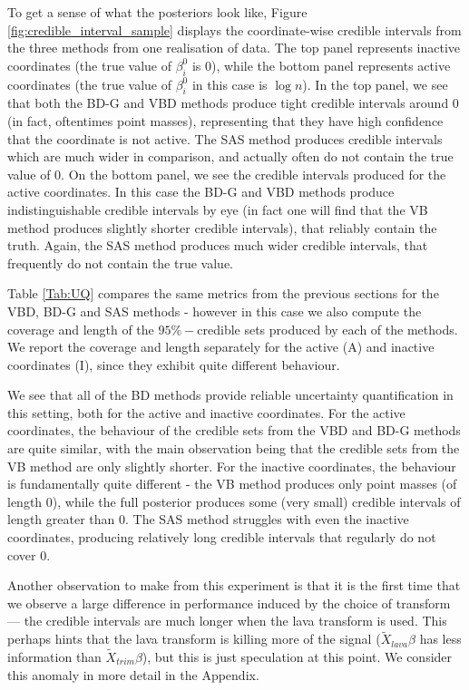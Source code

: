 \documentclass[11pt]{article}
\begin{document}
To get a sense of what the posteriors look like, Figure \ref{fig:credible_interval_sample} displays the coordinate-wise credible intervals from the three methods from one realisation of data. The top panel represents inactive coordinates (the true value of $\beta_i^0$ is 0), while the bottom panel represents active coordinates (the true value of $\beta_i^0$ in this case is $\log n$). In the top panel, we see that both the BD-G and VBD methods produce tight credible intervals around 0 (in fact, oftentimes point masses), representing that they have high confidence that the coordinate is not active. The SAS method produces credible intervals which are much wider in comparison, and actually often do not contain the true value of 0. On the bottom panel, we see the credible intervals produced for the active coordinates. In this case the BD-G and VBD methods produce indistinguishable credible intervals by eye (in fact one will find that the VB method produces slightly shorter credible intervals), that reliably contain the truth. Again, the SAS method produces much wider credible intervals, that frequently do not contain the true value.

Table \ref{Tab:UQ} compares the same metrics from the previous sections for the VBD, BD-G and SAS methods - however in this case we also compute the coverage and length of the $95\%-$credible sets produced by each of the methods. We report the coverage and length separately for the active (A) and inactive coordinates (I), since they exhibit quite different behaviour. 

We see that all of the BD methods provide reliable uncertainty quantification in this setting, both for the active and inactive coordinates. For the active coordinates, the behaviour of the credible sets from the VBD and BD-G methods are quite similar, with the main observation being that the credible sets from the VB method are only slightly shorter. For the inactive coordinates, the behaviour is fundamentally quite different - the VB method produces only point masses (of length 0), while the full posterior produces some (very small) credible intervals of length greater than 0. The SAS method struggles with even the inactive coordinates, producing relatively long credible intervals that regularly do not cover 0.

Another observation to make from this experiment is that it is the first time that we observe a large difference in performance induced by the choice of transform --- the credible intervals are much longer when the lava transform is used. This perhaps hints that the lava transform is killing more of the signal ($\tilde{X}_{lava} \beta$ has less information than $\tilde{X}_{trim} \beta$), but this is just speculation at this point. We consider this anomaly in more detail in the Appendix.
\end{document}
